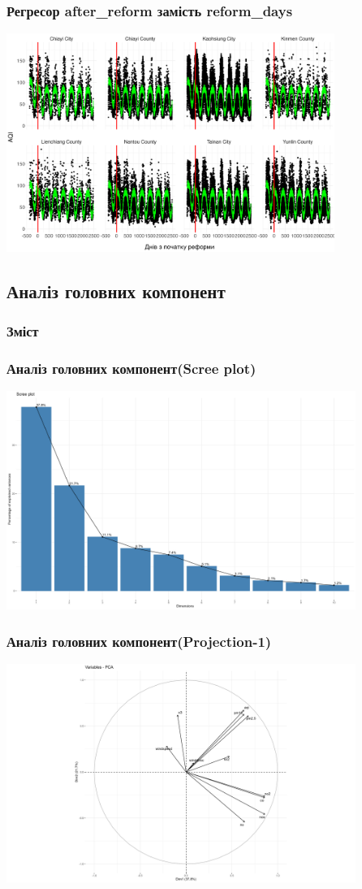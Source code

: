 \documentclass{beamer}
\begin{document}
\begin{frame}
\frametitle{Регресор after\_reform замість reform\_days}
  \includegraphics[height=2.8in]{plots/lab4/partial_linear/nppl_w_after_reform.png}
\end{frame}

\begin{frame}
  \section{Аналіз головних компонент}

  \frametitle{Зміст}
  \tableofcontents[currentsection]
\end{frame}

\begin{frame}
\frametitle{Аналіз головних компонент(Scree plot)}
  \includegraphics[height=2.8in]{plots/lab4/pca/scree.png}
\end{frame}

\begin{frame}
\frametitle{Аналіз головних компонент(Projection-1)}
  \includegraphics[height=2.8in]{plots/lab4/pca/projection-1-2.png}
\end{frame}
\end{document}
